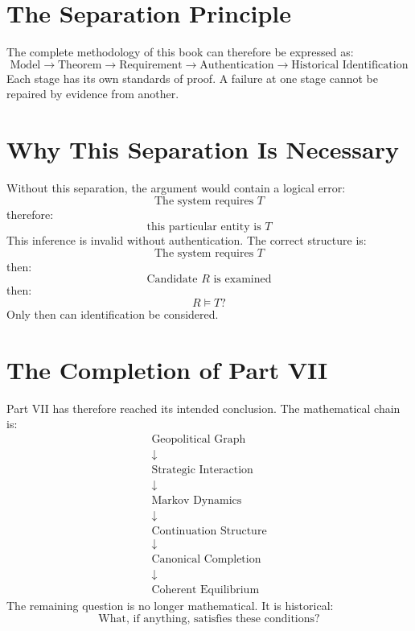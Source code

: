 \documentclass[11pt,openany]{book}
\theoremstyle{plain}
\theoremstyle{definition}
\begin{document}
\section{The Separation Principle}

The complete methodology of this book can therefore be expressed as:
\[
\boxed{
\text{Model} \longrightarrow \text{Theorem} \longrightarrow \text{Requirement} \longrightarrow \text{Authentication} \longrightarrow \text{Historical Identification}
}
\]
Each stage has its own standards of proof. A failure at one stage cannot be repaired by evidence from another.

\section{Why This Separation Is Necessary}

Without this separation, the argument would contain a logical error:
\[
\text{The system requires } T
\]
therefore:
\[
\text{this particular entity is } T
\]
This inference is invalid without authentication. The correct structure is:
\[
\text{The system requires } T
\]
then:
\[
\text{Candidate } R \text{ is examined}
\]
then:
\[
R \models T?
\]
Only then can identification be considered.

\section{The Completion of Part VII}

Part VII has therefore reached its intended conclusion. The mathematical chain is:
\[
\begin{gathered}
\text{Geopolitical Graph} \\
\downarrow \\
\text{Strategic Interaction} \\
\downarrow \\
\text{Markov Dynamics} \\
\downarrow \\
\text{Continuation Structure} \\
\downarrow \\
\text{Canonical Completion} \\
\downarrow \\
\text{Coherent Equilibrium}
\end{gathered}
\]
The remaining question is no longer mathematical. It is historical:
\[
\boxed{
\text{What, if anything, satisfies these conditions?}
}
\]

\end{document}
